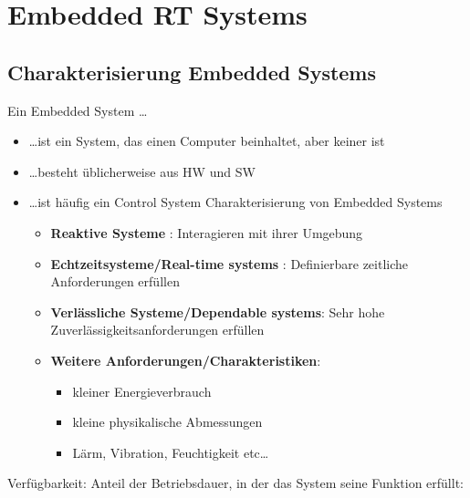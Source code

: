 \section{Embedded RT Systems }
\subsection{Charakterisierung Embedded Systems }
Ein Embedded System \ldots
\begin{itemize}
  \item \ldots ist ein System, das einen Computer beinhaltet, aber keiner ist
  \item \ldots besteht üblicherweise aus HW und SW
  \item \ldots ist häufig ein Control System
Charakterisierung von Embedded Systems
  \begin{itemize}
    \item \textbf{Reaktive Systeme} : Interagieren mit ihrer Umgebung
    \item \textbf{Echtzeitsysteme/Real-time systems} : Definierbare zeitliche
    Anforderungen erfüllen
    \item \textbf{Verlässliche Systeme/Dependable systems}: Sehr hohe
    Zuverlässigkeitsanforderungen erfüllen
    \item \textbf{Weitere Anforderungen/Charakteristiken}: 
    \begin{itemize}
      \item kleiner Energieverbrauch
      \item kleine physikalische Abmessungen
      \item Lärm, Vibration, Feuchtigkeit etc\ldots
    \end{itemize}
  \end{itemize}
\end{itemize}

Verfügbarkeit: Anteil der Betriebsdauer, in  der das System seine Funktion
erfüllt: 

